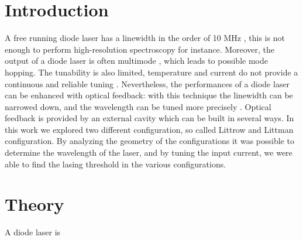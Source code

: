 \documentclass[a4paper,10pt]{article}
\begin{document}
\section{Introduction}
A free running diode laser has a linewidth in the order of 10 MHz \cite{skriptum}, this is not enough to perform high-resolution spectroscopy for instance. Moreover, the output of a diode laser is often multimode \cite{tunablelaser}, which leads to possible mode hopping. The tunability is also limited, temperature and current do not provide a continuous and reliable tuning \cite{lasertunability}. Nevertheless, the performances of a diode laser can be enhanced with optical feedback: with this technique the linewidth can be narrowed down, and the wavelength can be tuned more precisely \cite{lasermodulation}. Optical feedback is provided by an external cavity which can be built in several ways. In this work we explored two different configuration, so called Littrow and Littman configuration. By analyzing the geometry of the configurations it was possible to determine the wavelength of the laser, and by tuning the input current, we were able to find the lasing threshold in the various configurations.
\section{Theory}
A diode laser is
\end{document}
